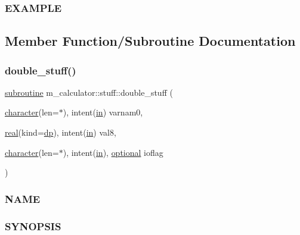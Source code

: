 \subsubsection*{E\+X\+A\+M\+P\+LE}

\subsection{Member Function/\+Subroutine Documentation}
\mbox{\label{interfacem__calculator_1_1stuff_a493c946ddd5ffdf8d0d7f006b93f7d83}} 
\subsubsection{\texorpdfstring{double\+\_\+stuff()}{double\_stuff()}}
{\footnotesize\ttfamily \hyperlink{M__stopwatch_83_8txt_acfbcff50169d691ff02d4a123ed70482}{subroutine} m\+\_\+calculator\+::stuff\+::double\+\_\+stuff (\begin{DoxyParamCaption}\item[{\hyperlink{option__stopwatch_83_8txt_abd4b21fbbd175834027b5224bfe97e66}{character}(len=$\ast$), intent(\hyperlink{M__journal_83_8txt_afce72651d1eed785a2132bee863b2f38}{in})}]{varnam0,  }\item[{\hyperlink{read__watch_83_8txt_abdb62bde002f38ef75f810d3a905a823}{real}(kind=\hyperlink{namespacem__calculator_aefb5a6c3001bb0f09ed82decb6def950}{dp}), intent(\hyperlink{M__journal_83_8txt_afce72651d1eed785a2132bee863b2f38}{in})}]{val8,  }\item[{\hyperlink{option__stopwatch_83_8txt_abd4b21fbbd175834027b5224bfe97e66}{character}(len=$\ast$), intent(\hyperlink{M__journal_83_8txt_afce72651d1eed785a2132bee863b2f38}{in}), \hyperlink{option__stopwatch_83_8txt_aa4ece75e7acf58a4843f70fe18c3ade5}{optional}}]{ioflag }\end{DoxyParamCaption})\hspace{0.3cm}{\ttfamily [private]}}



\subsubsection*{N\+A\+ME}

\subsubsection*{S\+Y\+N\+O\+P\+S\+IS}

